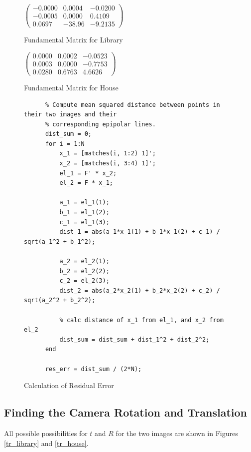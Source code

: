 \documentclass[11pt]{article}
\begin{document}
\begin{figure}[h!]
  \caption{Fundamental Matrix for Library}
  \label{f_lib}
  \centering
    $\begin{pmatrix}
      -0.0000&0.0004&-0.0200\\
      -0.0005&0.0000&0.4109\\
      0.0697&-38.96&-9.2135
    \end{pmatrix}$
\end{figure}
\begin{figure}[h!]
  \caption{Fundamental Matrix for House}
  \label{f_house}
  \centering
    $\begin{pmatrix}
      0.0000&0.0002&-0.0523\\
      0.0003&0.0000&-0.7753\\
      0.0280&0.6763& 4.6626
    \end{pmatrix}$
\end{figure}

\begin{figure}[h!]
  \caption{Calculation of Residual Error}
  \label{residual_code}
  \centering
    \begin{lstlisting}
      % Compute mean squared distance between points in their two images and their
      % corresponding epipolar lines.
      dist_sum = 0;
      for i = 1:N
          x_1 = [matches(i, 1:2) 1]';
          x_2 = [matches(i, 3:4) 1]';
          el_1 = F' * x_2;
          el_2 = F * x_1;
          
          a_1 = el_1(1);
          b_1 = el_1(2);
          c_1 = el_1(3);
          dist_1 = abs(a_1*x_1(1) + b_1*x_1(2) + c_1) / sqrt(a_1^2 + b_1^2);

          a_2 = el_2(1);
          b_2 = el_2(2);
          c_2 = el_2(3);
          dist_2 = abs(a_2*x_2(1) + b_2*x_2(2) + c_2) / sqrt(a_2^2 + b_2^2);

          % calc distance of x_1 from el_1, and x_2 from el_2
          dist_sum = dist_sum + dist_1^2 + dist_2^2;
      end

      res_err = dist_sum / (2*N);
    \end{lstlisting}
\end{figure}

\newpage
\subsection{Finding the Camera Rotation and Translation}
All possible possibilities for $t$ and $R$ for the two images are shown in
Figures \ref{tr_library} and \ref{tr_house}.
\end{document}
